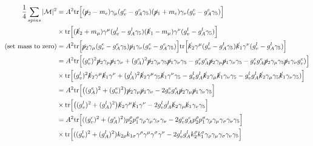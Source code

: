 \documentclass[11pt]{article}
\begin{document}
\begin{align*}
\frac{1}{4} \sum_{spins} |\mathcal{M}|^2 &= A^2 \text{tr}
\Big[ (\cancel{p}_2 -m_e)  
\gamma_{\mu} (g_v^e - g_A^e \gamma_5) (\cancel{p}_1 + m_e) 
\gamma_{\nu} (g_v^e - g_A^e \gamma_5)\Big]\\
& \times \text{tr} \Big[
(\cancel{k}_2 + m_{\mu}) \gamma^{\mu} (g_v^l - g_A^l \gamma_5) (\cancel{k}_1 - m_{\mu}) \gamma^{\nu} (g_v^l - g_A^l \gamma_5) 
\Big]\\
\text{(set mass to zero)}
&= A^2 \text{tr}
\Big[ \cancel{p}_2 
\gamma_{\mu} (g_v^e - g_A^e \gamma_5) \cancel{p}_1 
\gamma_{\nu} (g_v^e - g_A^e \gamma_5)\Big]
\text{tr} \Big[
\cancel{k}_2 \gamma^{\mu} (g_v^l - g_A^l \gamma_5) \cancel{k}_1 \gamma^{\nu} (g_v^l - g_A^l \gamma_5) 
\Big]\\
&= A^2 \text{tr}
\Big[ (g_v^e)^2 \cancel{p}_2 
\gamma_{\mu} 
\cancel{p}_1 
\gamma_{\nu} 
+
(g_A^e)^2
\cancel{p}_2 
\gamma_{\mu} \gamma_5
 \cancel{p}_1 
\gamma_{\nu} \gamma_5
- g_v^e g_A^e 
\cancel{p}_2 
\gamma_{\mu} \cancel{p}_1 
\gamma_{\nu} \gamma_5
- g_v^e g_A^e \cancel{p}_2 
\gamma_{\mu} \gamma_5 \cancel{p}_1 
\gamma_{\nu} g_v^e)
\Big] \\
& \times
\text{tr} \Big[
(g_v^l)^2
\cancel{k}_2 \gamma^{\mu} 
 \cancel{k}_1 \gamma^{\nu} 
+(g_A^l)^2
\cancel{k}_2 \gamma^{\mu} \gamma_5
 \cancel{k}_1 \gamma^{\nu} \gamma_5 
- g_v^l g_A^l 
\cancel{k}_2 
\gamma_{\mu} \cancel{k}_1 
\gamma_{\nu} \gamma_5
- g_v^l g_A^l \cancel{k}_2 
\gamma_{\mu} \gamma_5 \cancel{k}_1 
\gamma_{\nu}\gamma_5)
\Big] \\
&= A^2 \text{tr}
\Big[  
\big((g_A^e)^2 + (g_v^e)^2\big)
\cancel{p}_2 
\gamma_{\mu} 
 \cancel{p}_1 
\gamma_{\nu} 
- 2 g_v^e g_A^e 
\cancel{p}_2 
\gamma_{\mu} \cancel{p}_1 
\gamma_{\nu} \gamma_5 \Big]\\
& \times
\text{tr} \Big[
\big( (g_v^l)^2 +(g_A^l)^2 \big)
\cancel{k}_2 \gamma^{\mu} 
 \cancel{k}_1 \gamma^{\nu} 
- 2 g_v^l g_A^l 
\cancel{k}_2 
\gamma_{\mu} \cancel{k}_1 
\gamma_{\nu} \gamma_5
\Big] \\
&= A^2 \text{tr}
\Big[
 ((g_v^e)^2 + (g_A^e)^2)p_2^{\rho} p_1^{\sigma} \gamma_{\rho} 
\gamma_{\mu} 
 \gamma_{\sigma}
\gamma_{\nu} 
- 2 g_v^e g_A^e 
p_2^{\rho}  p_1^{\sigma} \gamma_{\rho} \gamma_{\mu}\gamma_{\sigma} \gamma_{\nu} \gamma_5
\Big]\\
&\times \text{tr} \Big[
((g_v^l)^2 + (g_A^l)^2) k_{2 \rho} k_{1 \sigma} \gamma^{\rho} \gamma^{\mu} 
 \gamma^{\sigma} \gamma^{\nu}
 - 2 g_v^l g_A^l 
k_2^{ \rho} k_1^{ \sigma} \gamma_{\rho}
\gamma_{\mu}  \gamma_{\sigma}
\gamma_{\nu} \gamma_5 
\Big]\\
\end{align*}
\end{document}
